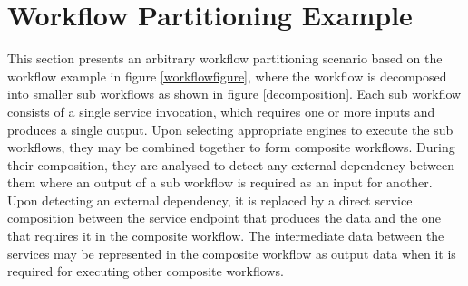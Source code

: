 \documentclass[10pt, conference, compsocconf]{IEEEtran}
\begin{document}
\section{Workflow Partitioning Example}\label{WorkflowPartitioningExample}

This section presents an arbitrary workflow partitioning scenario based on the workflow example in figure  \ref{workflowfigure}, where the workflow is decomposed into smaller sub workflows as shown in figure \ref{decomposition}.
Each sub workflow consists of a single service invocation, which requires one or more inputs and produces a single output.
Upon selecting appropriate engines to execute the sub workflows, they may be combined together to form composite workflows.
During their composition, they are analysed to detect any external dependency between them where an output of a sub workflow is required as an input for another.
Upon detecting an external dependency, it is replaced by a direct service composition between the service endpoint that produces the data and the one that requires it in the composite workflow.
The intermediate data between the services may be represented in the composite workflow as output data when it is required for executing other composite workflows.\\

\begin{figure*}[t]
\centering
  \\
\caption{Sub workflows obtained from decomposing the workflow shown in figure \ref{workflowfigure}.}
\label{decomposition}
\end{figure*}
\end{document}
